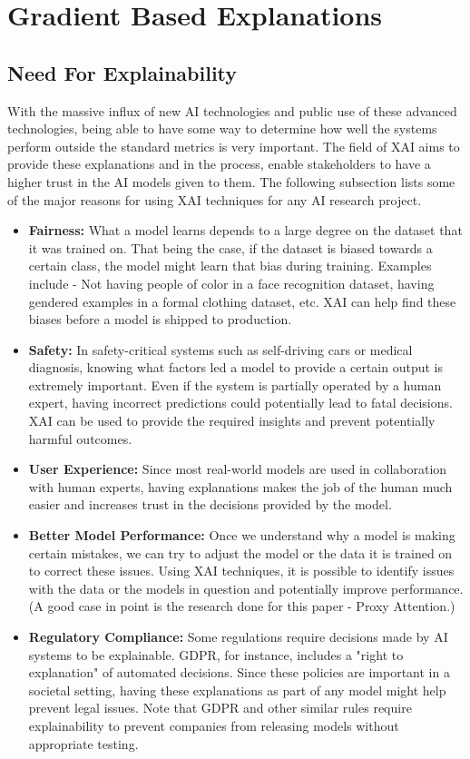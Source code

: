 \documentclass[a4paper,11pt,openright]{book}
\begin{document}
\section{Gradient Based Explanations} \label{sec:gradient_based_explanations}
\subsection{Need For Explainability}
With the massive influx of new AI technologies and public use of these advanced technologies, being able to have some way to determine how well the systems perform outside the standard metrics is very important. The field of XAI aims to provide these explanations and in the process, enable stakeholders to have a higher trust in the AI models given to them. The following subsection lists some of the major reasons for using XAI techniques for any AI research project.
\begin{itemize}
    \item \textbf{Fairness: } What a model learns depends to a large degree on the dataset that it was trained on. That being the case, if the dataset is biased towards a certain class, the model might learn that bias during training. Examples include - Not having people of color in a face recognition dataset, having gendered examples in a formal clothing dataset, etc. XAI can help find these biases before a model is shipped to production.
    \item \textbf{Safety: } In safety-critical systems such as self-driving cars or medical diagnosis, knowing what factors led a model to provide a certain output is extremely important. Even if the system is partially operated by a human expert, having incorrect predictions could potentially lead to fatal decisions. XAI can be used to provide the required insights and prevent potentially harmful outcomes.
    \item \textbf{User Experience: } Since most real-world models are used in collaboration with human experts, having explanations makes the job of the human much easier and increases trust in the decisions provided by the model.
    \item \textbf{Better Model Performance: } Once we understand why a model is making certain mistakes, we can try to adjust the model or the data it is trained on to correct these issues. Using XAI techniques, it is possible to identify issues with the data or the models in question and potentially improve performance. (A good case in point is the research done for this paper - Proxy Attention.)
    \item \textbf{Regulatory Compliance: } Some regulations require decisions made by AI systems to be explainable. GDPR, for instance, includes a "right to explanation" of automated decisions. Since these policies are important in a societal setting, having these explanations as part of any model might help prevent legal issues. Note that GDPR and other similar rules require explainability to prevent companies from releasing models without appropriate testing.
    \end{itemize}
\end{document}
